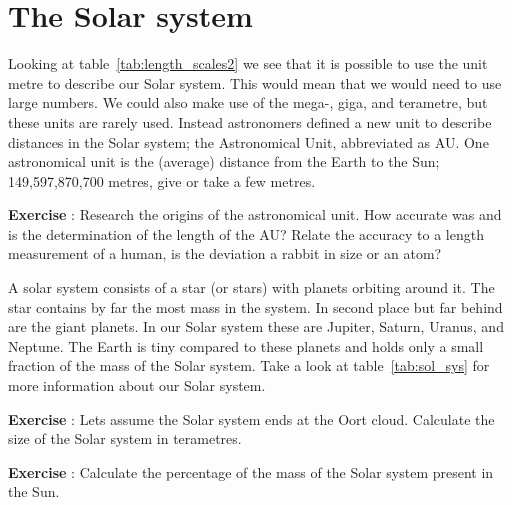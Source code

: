 \documentclass[12pt,a4paper]{article}
\numberwithin{equation}{section}
\numberwithin{figure}{section}
\newcounter{Exercise}
\numberwithin{table}{section}
\begin{document}
\section{The Solar system}
Looking at table~\ref{tab:length_scales2} we see that it is possible to use the unit metre to describe our Solar system. This would mean that we would need to use large numbers. We could also make use of the mega-, giga, and terametre, but these units are rarely used. Instead astronomers defined a new unit to describe distances in the Solar system; the Astronomical Unit, abbreviated as AU.
One astronomical unit is the (average) distance from the Earth to the Sun; 149,597,870,700 metres, give or take a few metres.
\begin{shaded}
\textbf{Exercise \theExercise {}} : Research the origins of the astronomical unit. How accurate was and is the determination of the length of the AU? Relate the accuracy to a length measurement of a human, is the deviation a rabbit in size or an atom?\end{shaded}

A solar system consists of a star (or stars) with planets orbiting around it. The star contains by far the most mass in the system. In second place but far behind are the giant planets. In our Solar system these are Jupiter, Saturn, Uranus, and Neptune. The Earth is tiny compared to these planets and holds only a small fraction of the mass of the Solar system. Take a look at table~\ref{tab:sol_sys} for more information about our Solar system.
\begin{shaded}
\textbf{Exercise \theExercise {}} : Lets assume the Solar system ends at the Oort cloud. Calculate the size of the Solar system in terametres.\end{shaded}
\begin{shaded}
\textbf{Exercise \theExercise {}} : Calculate the percentage of the mass of the Solar system present in the Sun.\end{shaded}
\end{document}
